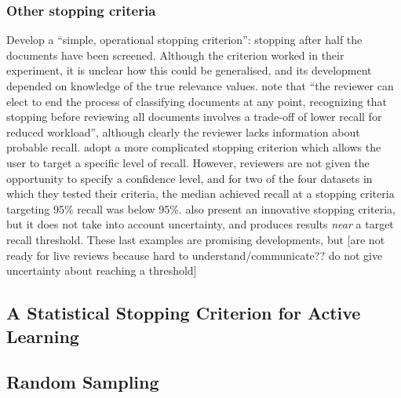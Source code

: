 \documentclass{bmcart}
\begin{document}
\subsubsection*{Other stopping criteria}

\cite{Wallace2010a} Develop a ``simple, operational stopping criterion'': stopping after half the documents have been screened. Although the criterion worked in their experiment, it is unclear how this could be generalised, and its development depended on knowledge of the true relevance values. 
\cite{Jonnalagadda2013} note that ``the reviewer can elect to end the process of classifying documents at any point, recognizing that stopping before reviewing all documents involves a trade-off of lower recall for reduced workload'', although clearly the reviewer lacks information about probable recall.
\cite{Yu2019} adopt a more complicated stopping criterion  which allows the user to target a specific level of recall. However, reviewers are not given the opportunity to specify a confidence level, and for two of the four datasets in which they tested their criteria, the median achieved recall at a stopping criteria targeting 95\% recall was below 95\%. \cite{DiNunzio2018} also present an innovative stopping criteria, but it does not take into account uncertainty, and produces results \textit{near} a target recall threshold. 
These last examples are promising developments, but [are not ready for live reviews because hard to understand/communicate?? do not give uncertainty about reaching a threshold]


\subsection*{A Statistical Stopping Criterion for Active Learning}

	\subsection*{Random Sampling}
\end{document}
